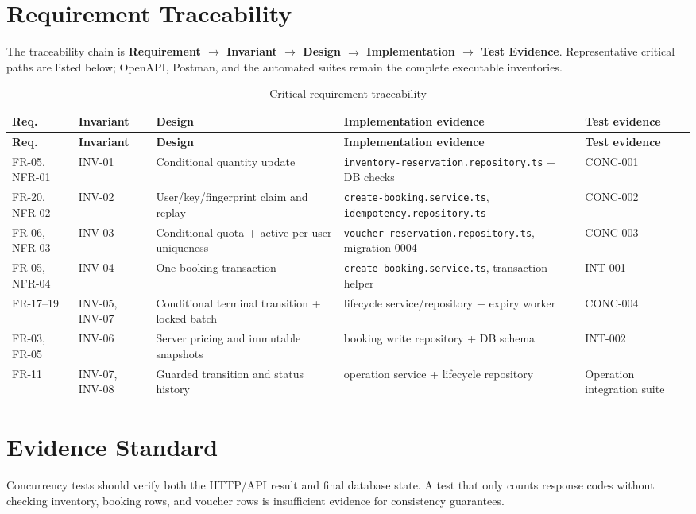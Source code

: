 \section{Requirement Traceability}
The traceability chain is \textbf{Requirement $\rightarrow$ Invariant
$\rightarrow$ Design $\rightarrow$ Implementation $\rightarrow$ Test
Evidence}. Representative critical paths are listed below; OpenAPI, Postman,
and the automated suites remain the complete executable inventories.

\begingroup
\setlength{\tabcolsep}{3pt}
\scriptsize
\begin{longtable}{p{}p{}p{}p{}p{}}
\caption{Critical requirement traceability}\label{tab:requirement-traceability}\\
\toprule
\textbf{Req.} & \textbf{Invariant} & \textbf{Design} & \textbf{Implementation evidence} & \textbf{Test evidence} \\
\midrule
\endfirsthead
\toprule
\textbf{Req.} & \textbf{Invariant} & \textbf{Design} & \textbf{Implementation evidence} & \textbf{Test evidence} \\
\midrule
\endhead
FR-05, NFR-01 & INV-01 & Conditional quantity update & \nolinkurl{inventory-reservation.repository.ts} + DB checks & CONC-001 \\
FR-20, NFR-02 & INV-02 & User/key/fingerprint claim and replay & \nolinkurl{create-booking.service.ts}, \nolinkurl{idempotency.repository.ts} & CONC-002 \\
FR-06, NFR-03 & INV-03 & Conditional quota + active per-user uniqueness & \nolinkurl{voucher-reservation.repository.ts}, migration 0004 & CONC-003 \\
FR-05, NFR-04 & INV-04 & One booking transaction & \nolinkurl{create-booking.service.ts}, transaction helper & INT-001 \\
FR-17--19 & INV-05, INV-07 & Conditional terminal transition + locked batch & lifecycle service/repository + expiry worker & CONC-004 \\
FR-03, FR-05 & INV-06 & Server pricing and immutable snapshots & booking write repository + DB schema & INT-002 \\
FR-11 & INV-07, INV-08 & Guarded transition and status history & operation service + lifecycle repository & Operation integration suite \\
\bottomrule
\end{longtable}
\endgroup

\section{Evidence Standard}
Concurrency tests should verify both the HTTP/API result and final database state. A test that only counts response codes without checking inventory, booking rows, and voucher rows is insufficient evidence for consistency guarantees.
